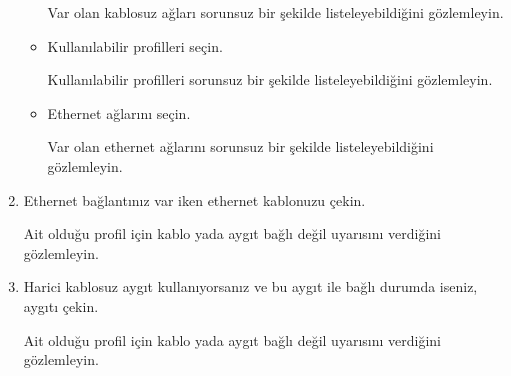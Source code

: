 \documentclass[a4paper,10pt]{article}
\begin{document}
\begin{enumerate}
\begin{itemize}
	 Var olan kablosuz ağları sorunsuz bir şekilde listeleyebildiğini gözlemleyin.
	
 	\item Kullanılabilir profilleri seçin.
	
	Kullanılabilir profilleri sorunsuz bir şekilde listeleyebildiğini gözlemleyin.
	
	\item Ethernet ağlarını seçin.
	
	 Var olan ethernet ağlarını sorunsuz bir şekilde listeleyebildiğini gözlemleyin.
	
	\end{itemize}
	\item Ethernet bağlantınız var iken ethernet kablonuzu çekin.

	Ait olduğu profil için kablo yada aygıt bağlı değil uyarısını verdiğini gözlemleyin.
	\item Harici kablosuz aygıt kullanıyorsanız ve bu aygıt ile bağlı durumda iseniz, aygıtı çekin.

	Ait olduğu profil için kablo yada aygıt bağlı değil uyarısını verdiğini gözlemleyin.

\end{enumerate}
\end{document}
